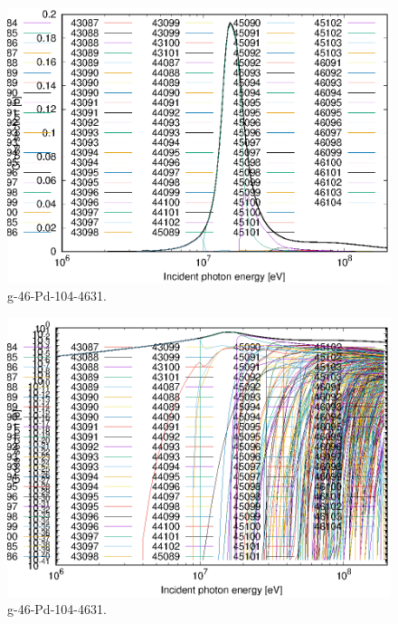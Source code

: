 \begin{figure}
 \includegraphics[width=\linewidth]{eps/g_46-Pd-104_4631.eps}
  \caption{g-46-Pd-104-4631.}
\end{figure}
\begin{figure}
 \includegraphics[width=\linewidth]{eps-log/g_46-Pd-104_4631.eps}
 \caption{g-46-Pd-104-4631.}
\end{figure}
\newpage \clearpage

